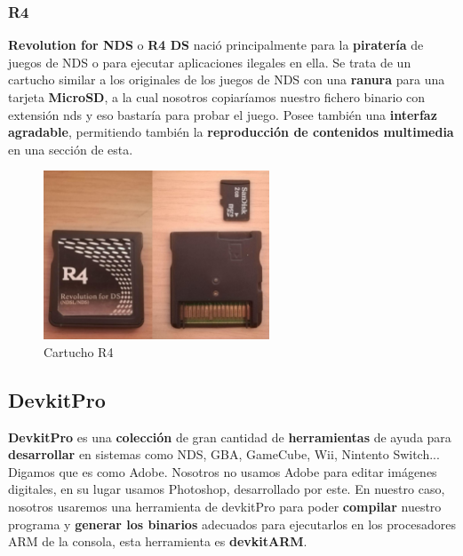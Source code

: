 \subsubsection{R4}

\textbf{Revolution for NDS} o \textbf{R4 DS} nació principalmente para la \textbf{piratería} de juegos de NDS o para ejecutar aplicaciones ilegales en ella. Se trata de un cartucho similar a los originales de los juegos de NDS con una \textbf{ranura} para una tarjeta \textbf{MicroSD}, a la cual nosotros copiaríamos nuestro fichero binario con extensión nds y eso bastaría para probar el juego. Posee también una \textbf{interfaz agradable}, permitiendo también la \textbf{reproducción de contenidos multimedia} en una sección de esta.

\vspace{0.5cm}

\begin{figure}[htbp]
\centering
  \includegraphics[width=0.6\textwidth]{archivos/r4.jpg}
  \caption{Cartucho R4}
  \label{fig:r4}
\end{figure}

\vspace{1cm}

\subsection{DevkitPro}

\textbf{DevkitPro} es una \textbf{colección} de gran cantidad de \textbf{herramientas} de ayuda para \textbf{desarrollar} en sistemas como NDS, GBA, GameCube, Wii, Nintento Switch... Digamos que es como Adobe. Nosotros no usamos Adobe para editar imágenes digitales, en su lugar usamos Photoshop, desarrollado por este. En nuestro caso, nosotros usaremos una herramienta de devkitPro para poder \textbf{compilar} nuestro programa y \textbf{generar los binarios} adecuados para ejecutarlos en los procesadores ARM de la consola, esta herramienta es \textbf{devkitARM}.

